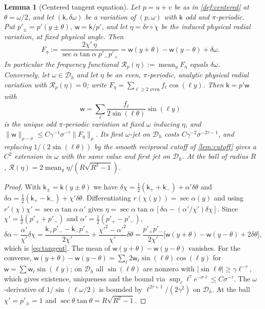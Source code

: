 \documentclass[11pt]{amsart}
\numberwithin{equation}{section}
\newtheorem{lemma}[theorem]{Lemma}
\theoremstyle{definition}
\theoremstyle{remark}
\newcommand{\abs}[1]{\lvert #1\rvert}
\newcommand{\norm}[1]{\lVert #1\rVert}
\newcommand{\mean}{\operatorname{mean}}
\newcommand{\cR}{\mathcal R}
\newcommand{\Dh}{\mathcal D_h}
\begin{document}
\begin{lemma}[Centered tangent equation]\label{lem:tangent}
Let $p=u+v$ be as in \cref{def:centered} at $\theta=\omega/2$, and let $(\mathsf k,\delta\omega)$ be a variation of $(p,\omega)$ with $\mathsf k$ odd and $\pi$-periodic. Put $p'_\pm=p'(y\pm\theta)$, $\mathsf w=\mathsf k/p'$, and let $\eta=\delta r\circ\chi$ be the induced physical radial variation, at fixed physical angle. Then
\begin{equation}\label{eq:tangent}
F_\eta:=\frac{2\chi'\,\eta}{\sec\alpha\tan\alpha\;p'_-p'_+}=\mathsf w(y+\theta)-\mathsf w(y-\theta)+\delta\omega .
\end{equation}
In particular the \emph{frequency functional} $\cR_p(\eta):=\mean_yF_\eta$ equals $\delta\omega$. Conversely, let $\omega\in\Dh$ and let $\eta$ be an even, $\pi$-periodic, analytic physical radial variation with $\cR_p(\eta)=0$; write $F_\eta=\sum_{\ell\ge2\text{ even}}f_\ell\cos(\ell y)$. Then $\mathsf k=p'\mathsf w$ with
\begin{equation}\label{eq:tangentinv}
\mathsf w=\sum_\ell\frac{f_\ell}{2\sin(\ell\theta)}\sin(\ell y)
\end{equation}
is the unique odd $\pi$-periodic variation at fixed $\omega$ inducing $\eta$, and $\norm{\mathsf w}_{\rho-\sigma}\le C\gamma^{-1}\sigma^{-\tau}\norm{F_\eta}_\rho$. Its first $\omega$-jet on $\Dh$ costs $C\gamma^{-2}\sigma^{-2\tau-1}$, and replacing $1/(2\sin(\ell\theta))$ by the smooth reciprocal cutoff of \cref{lem:cutoff} gives a $C^2$ extension in $\omega$ with the same value and first jet on $\Dh$. At the ball of radius $R$, $\cR(\eta)=2\mean_y\eta/(R\sqrt{R^2-1})$.
\end{lemma}

\begin{proof}
With $\mathsf k_\pm=\mathsf k(y\pm\theta)$ we have $\delta\chi=\frac12(\mathsf k_++\mathsf k_-)+\alpha'\delta\theta$ and $\delta\alpha=\frac12(\mathsf k_+-\mathsf k_-)+\chi'\delta\theta$. Differentiating $r(\chi(y))=\sec\alpha(y)$ and using $r'(\chi)\chi'=\sec\alpha\tan\alpha\,\alpha'$ gives $\eta=\sec\alpha\tan\alpha\,[\delta\alpha-(\alpha'/\chi')\delta\chi]$. Since $\chi'=\frac12(p'_++p'_-)$ and $\alpha'=\frac12(p'_+-p'_-)$,
\[
\delta\alpha-\frac{\alpha'}{\chi'}\delta\chi=\frac{\mathsf k_+p'_--\mathsf k_-p'_+}{2\chi'}+\frac{\chi'^2-\alpha'^2}{\chi'}\delta\theta=\frac{p'_+p'_-}{2\chi'}\bigl[\mathsf w(y+\theta)-\mathsf w(y-\theta)+2\delta\theta\bigr],
\]
which is \eqref{eq:tangent}. The mean of $\mathsf w(y+\theta)-\mathsf w(y-\theta)$ vanishes. For the converse, $\mathsf w(y+\theta)-\mathsf w(y-\theta)=\sum_\ell2\mathsf w_\ell\sin(\ell\theta)\cos(\ell y)$ for $\mathsf w=\sum\mathsf w_\ell\sin(\ell y)$; on $\Dh$ all $\sin(\ell\theta)$ are nonzero with $\abs{\sin\ell\theta}\ge\gamma\ell^{-\tau}$, which gives existence, uniqueness and the bound via $\sup_\ell\ell^\tau e^{-\sigma\ell}\le C\sigma^{-\tau}$. The $\omega$-derivative of $1/\sin(\ell\omega/2)$ is bounded by $\ell^{2\tau+1}/(2\gamma^2)$ on $\Dh$. At the ball $\chi'=p'_\pm=1$ and $\sec\theta\tan\theta=R\sqrt{R^2-1}$.
\end{proof}
\end{document}
